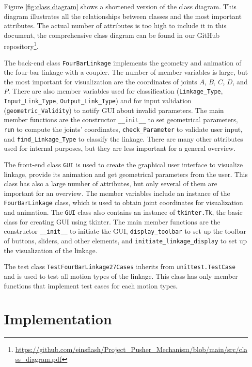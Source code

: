 \documentclass{article}
\begin{document}
Figure \ref{fig:class diagram} shows a shortened version of the class diagram. This diagram illustrates all the relationships between classes and the most important attributes. The actual number of attributes is too high to include it in this document, the comprehensive class diagram can be found in our GitHub repository\footnote{\url{https://github.com/einsflash/Project_Pusher_Mechanism/blob/main/src/class_diagram.pdf}}.

The back-end class \texttt{FourBarLinkage} implements the geometry and animation of the four-bar linkage with a coupler. The number of member variables is large, but the most important for visualization are the coordinates of joints $A$, $B$, $C$, $D$, and $P$. There are also member variables used for classification (\texttt{Linkage\_Type}, \texttt{Input\_Link\_Type}, \texttt{Output\_Link\_Type}) and for input validation (\texttt{geometric\_Validity}) to notify GUI about invalid parameters. The main member functions are the constructor \texttt{\_\_init\_\_} to set geometrical parameters, \texttt{run} to compute the joints' coordinates, \texttt{check\_Parameter} to validate user input, and \texttt{find\_Linkage\_Type} to classify the linkage. There are many other attributes used for internal purposes, but they are less important for a general overview.

The front-end class \texttt{GUI} is used to create the graphical user interface to visualize linkage, provide its animation and get geometrical parameters from the user. This class has also a large number of attributes, but only several of them are important for an overview. The member variables include an instance of the \texttt{FourBarLinkage} class, which is used to obtain joint coordinates for visualization and animation. The \texttt{GUI} class also contains an instance of \texttt{tkinter.Tk}, the basic class for creating GUI using tkinter. The main member functions are the constructor \texttt{\_\_init\_\_} to initiate the GUI, \texttt{display\_toolbar} to set up the toolbar of buttons, sliders, and other elements, and \texttt{initiate\_linkage\_display} to set up the visualization of the linkage.

The test class \texttt{TestFourBarLinkage27Cases} inherits from \texttt{unittest.TestCase} and is used to test all motion types of the linkage. This class has only member functions that implement test cases for each motion types.

\section{Implementation} \label{ch:implementation}
\end{document}
